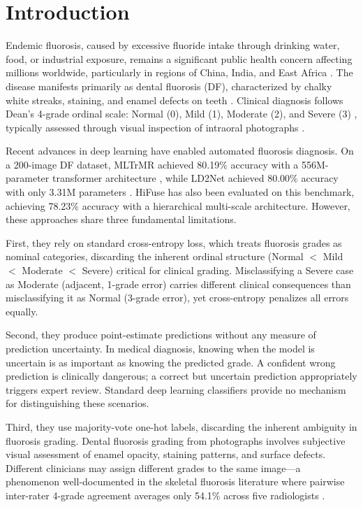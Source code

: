 \section{Introduction}

Endemic fluorosis, caused by excessive fluoride intake through drinking water, food, or industrial exposure, remains a significant public health concern affecting millions worldwide, particularly in regions of China, India, and East Africa \cite{gu2024zunyi,wei2019pathogenesis}. The disease manifests primarily as dental fluorosis (DF), characterized by chalky white streaks, staining, and enamel defects on teeth \cite{fejerskov1988dental,denbesten2011biological}. Clinical diagnosis follows Dean's 4-grade ordinal scale: Normal (0), Mild (1), Moderate (2), and Severe (3) \cite{dean1942fluorosis}, typically assessed through visual inspection of intraoral photographs \cite{schwendicke2021deep}.

Recent advances in deep learning have enabled automated fluorosis diagnosis. On a 200-image DF dataset, MLTrMR achieved 80.19\% accuracy with a 556M-parameter transformer architecture \cite{xu2025mltrmr}, while LD2Net achieved 80.00\% accuracy with only 3.31M parameters \cite{li2026ld2net}. HiFuse \cite{huo2024hifuse} has also been evaluated on this benchmark, achieving 78.23\% accuracy with a hierarchical multi-scale architecture. However, these approaches share three fundamental limitations.

First, they rely on standard cross-entropy loss, which treats fluorosis grades as nominal categories, discarding the inherent ordinal structure (Normal $<$ Mild $<$ Moderate $<$ Severe) critical for clinical grading. Misclassifying a Severe case as Moderate (adjacent, 1-grade error) carries different clinical consequences than misclassifying it as Normal (3-grade error), yet cross-entropy penalizes all errors equally.

Second, they produce point-estimate predictions without any measure of prediction uncertainty. In medical diagnosis, knowing when the model is uncertain is as important as knowing the predicted grade. A confident wrong prediction is clinically dangerous; a correct but uncertain prediction appropriately triggers expert review. Standard deep learning classifiers provide no mechanism for distinguishing these scenarios.

Third, they use majority-vote one-hot labels, discarding the inherent ambiguity in fluorosis grading. Dental fluorosis grading from photographs involves subjective visual assessment of enamel opacity, staining patterns, and surface defects. Different clinicians may assign different grades to the same image---a phenomenon well-documented in the skeletal fluorosis literature where pairwise inter-rater 4-grade agreement averages only 54.1\% across five radiologists \cite{xu2025mwinc}.

